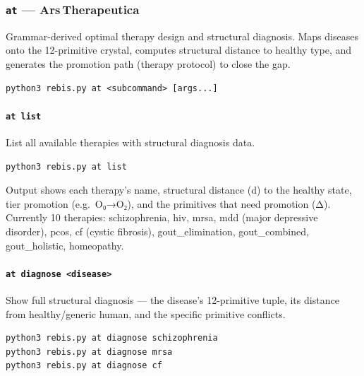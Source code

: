 \documentclass[12pt,a4paper]{article}
\begin{document}
\hypertarget{at-ars-therapeutica}{%
\subsubsection{\texorpdfstring{\texttt{at} ---
Ars\,Therapeutica}{at --- Ars\,Therapeutica}}\label{at-ars-therapeutica}}

Grammar-derived optimal therapy design and structural diagnosis. Maps
diseases onto the 12-primitive crystal, computes structural distance to
healthy type, and generates the promotion path (therapy protocol) to
close the gap.

\begin{verbatim}
python3 rebis.py at <subcommand> [args...]
\end{verbatim}

\hypertarget{at-list}{%
\paragraph{\texorpdfstring{\texttt{at\ list}}{at list}}\label{at-list}}

List all available therapies with structural diagnosis data.

\begin{verbatim}
python3 rebis.py at list
\end{verbatim}

Output shows each therapy's name, structural distance (d) to the healthy
state, tier promotion (e.g.~O₀→O₂), and the primitives that need
promotion (Δ). Currently 10 therapies: schizophrenia, hiv, mrsa, mdd
(major depressive disorder), pcos, cf (cystic fibrosis),
gout\_elimination, gout\_combined, gout\_holistic, homeopathy.

\hypertarget{at-diagnose-disease}{%
\paragraph{\texorpdfstring{\texttt{at\ diagnose\ \textless{}disease\textgreater{}}}{at diagnose \textless disease\textgreater{}}}\label{at-diagnose-disease}}

Show full structural diagnosis --- the disease's 12-primitive tuple, its
distance from healthy/generic human, and the specific primitive
conflicts.

\begin{verbatim}
python3 rebis.py at diagnose schizophrenia
python3 rebis.py at diagnose mrsa
python3 rebis.py at diagnose cf
\end{verbatim}
\end{document}
